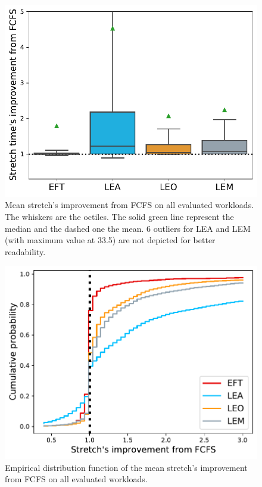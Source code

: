 \documentclass[sigconf,review,anonymous]{acmart}
\newcommand{\rev}[1]{{\color{blue}{#1}}}
\begin{document}
\subsection{\rev{Aggregated results on 12 different evaluated weeks of the workload}}

\begin{figure}[t]\centering\includegraphics[width=0.9\linewidth]{../MBSS/plot/Boxplot/byuser/box_plot_stretch_all-all_1.pdf}\caption{Mean stretch's improvement from FCFS on all evaluated workloads. The whiskers are the octiles. The solid green line represent the median and the dashed one the mean. 6 outliers for LEA and LEM (with maximum value at 33.5) are not depicted for better readability.}\label{boxplot.all}\end{figure}
\begin{figure}[t]\centering\includegraphics[width=0.9\linewidth]{../MBSS/plot/ECDF/byuser/ecdf_stretch_all-all.pdf}\caption{Empirical distribution function of the mean stretch's improvement from FCFS on all evaluated workloads.}\label{ecdf}\end{figure}
\end{document}
